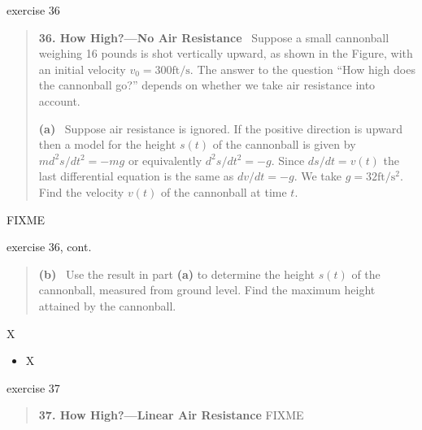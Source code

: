 \documentclass{beamer}
\begin{document}
\begin{frame}{exercise 36}

\begin{minipage}[t]{0.75\textwidth}
\small
\begin{quotation}
\noindent \textbf{36. How High?---No Air Resistance} \, Suppose a small cannonball weighing 16 pounds is shot vertically upward, as shown in the Figure, with an initial velocity $v_0 = 300 \text{ft}/\text{s}$.  The answer to the question ``How high does the cannonball go?'' depends on whether we take air resistance into account.

\noindent \textbf{(a)} \, Suppose air resistance is ignored.  If the positive direction is upward then a model for the height $s(t)$ of the cannonball is given by $m d^2s/dt^2 = - mg$ or equivalently $d^2s/dt^2 = - g$.  Since $ds/dt = v(t)$ the last differential equation is the same as $dv/dt = -g$.  We take $g=32 \text{ft}/\text{s}^2$.  Find the velocity $v(t)$ of the cannonball at time $t$.
\end{quotation}
\end{minipage}
\begin{minipage}[t]{0.25\textwidth}
\vspace{0mm}
FIXME
\end{minipage}
\end{frame}


\begin{frame}{exercise 36, cont.}

\small
\begin{quotation}
\noindent \textbf{(b)} \, Use the result in part \textbf{(a)} to determine the height $s(t)$ of the cannonball, measured from ground level.  Find the maximum height attained by the cannonball.
\end{quotation}

\vspace{50mm}
\end{frame}


\begin{frame}{X}


\begin{itemize}
\item X
\end{itemize}
\end{frame}


\begin{frame}{exercise 37}

\begin{quotation}
\noindent \textbf{37.  How High?---Linear Air Resistance}  FIXME
\end{quotation}

\vspace{50mm}
\end{frame}
\end{document}
